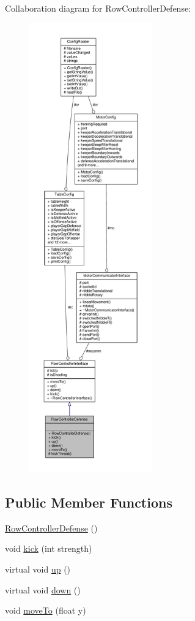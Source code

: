 Collaboration diagram for Row\+Controller\+Defense\+:\nopagebreak
\begin{figure}[H]
\begin{center}
\leavevmode
\includegraphics[height=550pt]{class_row_controller_defense__coll__graph}
\end{center}
\end{figure}
\subsection*{Public Member Functions}
\begin{DoxyCompactItemize}
\item 
\hyperlink{class_row_controller_defense_a1cf09bde94f33577e94d3ee8ce8592a1}{Row\+Controller\+Defense} ()
\item 
void \hyperlink{class_row_controller_defense_a176213f0f92581a752a9f6221f160582}{kick} (int strength)
\item 
virtual void \hyperlink{class_row_controller_defense_a59de61112af1c45d6757a879c2e10ff1}{up} ()
\item 
virtual void \hyperlink{class_row_controller_defense_a50317aa64bcf854972f23eb22099921d}{down} ()
\item 
void \hyperlink{class_row_controller_defense_a4633acf0b0bfb904b8eba74cf05b24fa}{move\+To} (float y)
\end{DoxyCompactItemize}
